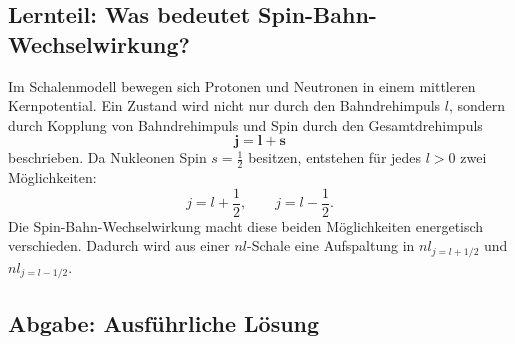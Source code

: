 \documentclass[11pt,a4paper]{scrartcl}
\newcommand{\vect}[1]{\bm{#1}}
\newcommand{\half}{\frac{1}{2}}
\theoremstyle{definition}
\theoremstyle{plain}
\theoremstyle{remark}
\begin{document}
\subsection{Lernteil: Was bedeutet Spin-Bahn-Wechselwirkung?}

\begin{learningbox}
Im Schalenmodell bewegen sich Protonen und Neutronen in einem mittleren Kernpotential. Ein Zustand wird nicht nur durch den Bahndrehimpuls $l$, sondern durch Kopplung von Bahndrehimpuls und Spin durch den Gesamtdrehimpuls
\[
    \vect{j}=\vect{l}+\vect{s}
\]
beschrieben. Da Nukleonen Spin $s=\half$ besitzen, entstehen f\"ur jedes $l>0$ zwei M\"oglichkeiten:
\[
    j=l+\half,
    \qquad
    j=l-\half.
\]
Die Spin-Bahn-Wechselwirkung macht diese beiden M\"oglichkeiten energetisch verschieden. Dadurch wird aus einer $nl$-Schale eine Aufspaltung in $nl_{j=l+1/2}$ und $nl_{j=l-1/2}$.
\end{learningbox}

\subsection{Abgabe: Ausf\"uhrliche L\"osung}
\end{document}
